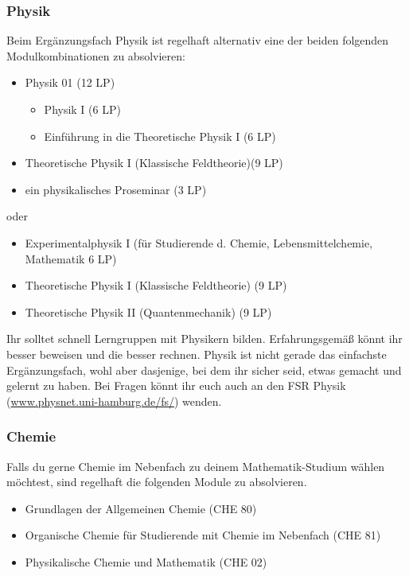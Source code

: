 \clearpage

\subsubsection{Physik}

Beim Ergänzungsfach Physik ist regelhaft alternativ eine der
beiden folgenden Modulkombinationen zu absolvieren:

\begin{itemize}\itemsep 0pt
    \item Physik 01 (12 LP)
          \begin{itemize}\itemsep 0pt
              \item Physik I (6 LP)
              \item Einführung in die Theoretische Physik I (6 LP)
          \end{itemize}
    \item Theoretische Physik I (Klassische Feldtheorie)(9 LP)
    \item ein physikalisches Proseminar (3 LP)
\end{itemize}
oder
\begin{itemize}\itemsep 0pt
    \item Experimentalphysik I (für Studierende d. Chemie, Lebensmittelchemie,
    Mathematik 6 LP)
    \item Theoretische Physik I (Klassische Feldtheorie) (9 LP)
    \item Theoretische Physik II (Quantenmechanik) (9 LP)
\end{itemize}

Ihr solltet schnell Lerngruppen mit Physikern bilden.  Erfahrungsgemäß könnt
ihr besser beweisen und die besser rechnen. Physik ist nicht gerade das
einfachste Ergänzungsfach, wohl aber dasjenige, bei dem ihr sicher seid, etwas
gemacht und gelernt zu haben. Bei Fragen könnt ihr euch auch an den FSR Physik
(\url{www.physnet.uni-hamburg.de/fs/}) wenden.

\subsubsection{Chemie}

Falls du gerne Chemie im Nebenfach zu deinem Mathematik-Studium wählen
möchtest, sind regelhaft die folgenden Module zu absolvieren.

\begin{itemize}\itemsep 0pt
    \item Grundlagen der Allgemeinen Chemie (CHE 80)
    \item Organische Chemie für Studierende mit Chemie im Nebenfach  (CHE 81)
    \item Physikalische Chemie und Mathematik (CHE 02)
\end{itemize}

